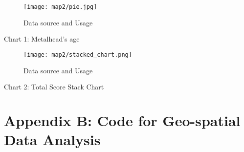 \documentclass[11pt]{article}
\begin{document}
\begin{figure}[H]
\begin{center}
\centering
\texttt{[image: map2/pie.jpg]}
\caption{Data source and Usage}
\label{fig:figure1}
\end{center}
\end{figure}

\begin{center}
\centering
Chart 1: Metalhead's age
\end{center}

\begin{figure}[H]
\begin{center}
\centering
\texttt{[image: map2/stacked\_chart.png]}
\caption{Data source and Usage}
\label{fig:figure1}
\end{center}
\end{figure}

\begin{center}
\centering
Chart 2: Total Score Stack Chart
\end{center}


\newpage
\section{Appendix B: Code for Geo-spatial Data Analysis}
\end{document}
